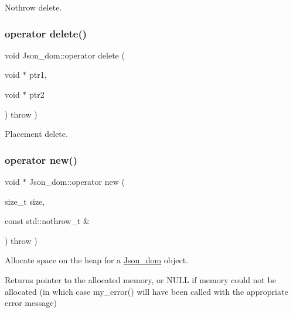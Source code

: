 Nothrow delete. \mbox{\label{classJson__dom_ada3ed296e9b3b6509fb2a539eb592473}} 
\subsubsection{\texorpdfstring{operator delete()}{operator delete()}\hspace{0.1cm}{\footnotesize\ttfamily [3/3]}}
{\footnotesize\ttfamily void Json\+\_\+dom\+::operator delete (\begin{DoxyParamCaption}\item[{void $\ast$}]{ptr1,  }\item[{void $\ast$}]{ptr2 }\end{DoxyParamCaption}) throw  ) \hspace{0.3cm}{\ttfamily [inline]}}

Placement delete. \mbox{\label{classJson__dom_a7d1dd22b98e18d568cd5d506bc3e2d11}} 
\subsubsection{\texorpdfstring{operator new()}{operator new()}\hspace{0.1cm}{\footnotesize\ttfamily [1/2]}}
{\footnotesize\ttfamily void $\ast$ Json\+\_\+dom\+::operator new (\begin{DoxyParamCaption}\item[{size\+\_\+t}]{size,  }\item[{const std\+::nothrow\+\_\+t \&}]{ }\end{DoxyParamCaption}) throw  ) }

Allocate space on the heap for a \mbox{\hyperlink{classJson__dom}{Json\+\_\+dom}} object.

\begin{DoxyReturn}{Returns}
pointer to the allocated memory, or N\+U\+LL if memory could not be allocated (in which case my\+\_\+error() will have been called with the appropriate error message) 
\end{DoxyReturn}
\mbox{\label{classJson__dom_a5cd9c48436205d68c377489fbfeddbb0}} 
